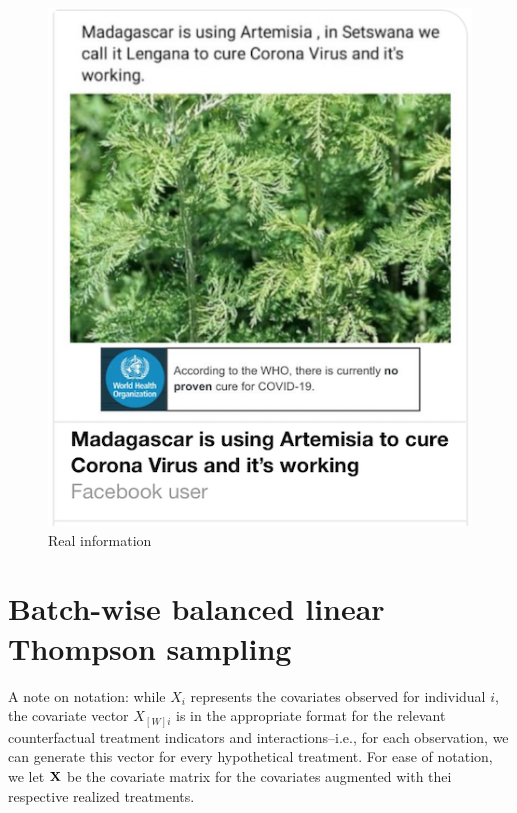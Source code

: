 \documentclass[letterpaper, 12pt, parskip=full,]{scrartcl}
\begin{document}
\begin{figure}[htb]
\begin{minipage}{0.45\textwidth}
        \includegraphics[width=\textwidth]{figures/treat_realinfo.png} 
        \caption*{Real information}
    \end{minipage}
\end{figure}

\FloatBarrier
\section{Batch-wise balanced linear Thompson sampling}\label{appendix:agent}

A note on notation: while $X_i$ represents the covariates observed for individual $i$, the covariate vector $X_{[W]i}$ is in the appropriate format for the relevant counterfactual treatment indicators and interactions--i.e., for each observation, we can generate this vector for every hypothetical treatment. For ease of notation, we let $\mathbf{X}$ be the covariate matrix for the covariates augmented with thei respective realized treatments. 
\end{document}
